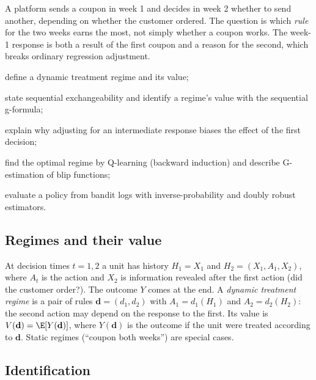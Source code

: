 \documentclass[11pt]{article}
\begin{document}

\begin{decision}
A platform sends a coupon in week 1 and decides in week 2 whether to send another, depending on whether the
customer ordered. The question is which \emph{rule} for the two weeks earns the most, not simply whether a coupon works.
The week-1 response is both a result of the first coupon and a reason for the second, which breaks ordinary regression
adjustment.
\end{decision}

\begin{goals}
  \item define a dynamic treatment regime and its value;
  \item state sequential exchangeability and identify a regime's value with the sequential g-formula;
  \item explain why adjusting for an intermediate response biases the effect of the first decision;
  \item find the optimal regime by Q-learning (backward induction) and describe G-estimation of blip functions;
  \item evaluate a policy from bandit logs with inverse-probability and doubly robust estimators.
\end{goals}

\sectionone

\subsection{Regimes and their value}

At decision times $t = 1, 2$ a unit has history $H_1 = X_1$ and $H_2 = (X_1, A_1, X_2)$, where $A_t$ is the action and
$X_2$ is information revealed after the first action (did the customer order?). The outcome $Y$ comes at the end. A
\emph{dynamic treatment regime} is a pair of rules $\mathbf d = (d_1, d_2)$ with $A_1 = d_1(H_1)$ and $A_2 = d_2(H_2)$: the
second action may depend on the response to the first. Its value is $V(\mathbf d) = \E[Y(\mathbf d)]$, where $Y(\mathbf d)$ is the
outcome if the unit were treated according to $\mathbf d$. Static regimes (``coupon both weeks'') are special cases.

\subsection{Identification}
\end{document}
